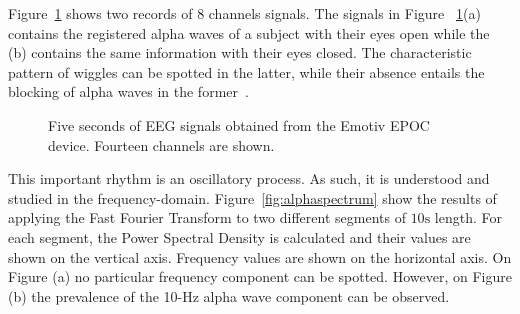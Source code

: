 Figure~\ref{fig:alphawavessignals} shows two records of 8 channels signals.  The signals in Figure ~\ref{fig:alphawavessignals}(a) contains the registered alpha waves of a subject with their eyes open while the (b) contains the same information with their eyes closed.  The characteristic pattern of wiggles can be spotted in the latter, while their absence entails the blocking of alpha waves in the former~\cite{Basar2012}.

\begin{figure}[h!]
\centering
{}
\caption[Alpha Waves Wiggles]{Five seconds of EEG signals obtained from the Emotiv EPOC device.  Fourteen channels are shown.}
\label{fig:alphawavessignals}
\end{figure}

This important rhythm is an oscillatory process.  As such, it is understood and studied in the frequency-domain.   Figure~\ref{fig:alphaspectrum} show the results of applying the Fast Fourier Transform to two different segments of $10\si{\second}$ length.  For each segment, the Power Spectral Density is calculated and their values are shown on the vertical axis.  Frequency values are shown on the horizontal axis.   On Figure (a) no particular frequency component can be spotted.  However, on Figure (b) the prevalence of the 10-\si{\hertz} alpha wave component can be observed.   
 
